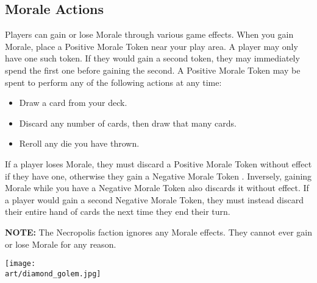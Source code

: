 \begin{multicols*}{2}
\subsection*{Morale Actions}
Players can gain or lose Morale through various game effects.
When you gain Morale, place a Positive Morale Token  near your play area.
A player may only have one such token.
If they would gain a second token, they may immediately spend the first one before gaining the second.
A Positive Morale Token may be spent to perform any of the following actions at any time:
\begin{itemize}
  \item Draw a card from your deck.
  \item Discard any number of cards, then draw that many cards.
  \item Reroll any die you have thrown.
\end{itemize}

If a player loses Morale, they must discard a Positive Morale Token  without effect if they have one, otherwise they gain a Negative Morale Token .
Inversely, gaining Morale while you have a Negative Morale Token also discards it without effect.
If a player would gain a second Negative Morale Token, they must instead discard their entire hand of cards the next time they end their turn.\par
\textbf{NOTE:} The Necropolis  faction ignores any Morale effects.
They cannot ever gain or lose Morale for any reason.

\vspace*{\fill}

\texttt{[image: \\art/diamond\_golem.jpg]}

\vspace*{\fill}

\end{multicols*}
